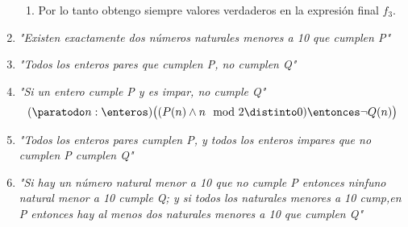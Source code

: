\begin{enumerate}[label=\tiny\faIcon{yin-yang}$_{\arabic*}$]
\begin{enumerate}[label=\tiny\faIcon{meh-rolling-eyes}]
          \item Por lo tanto obtengo siempre valores verdaderos en la expresión final $f_3$.
        \end{enumerate}

  \item \textit{"Existen exactamente dos números naturales menores a 10 que cumplen P"}

  \item \textit{"Todos los enteros pares que cumplen P, no cumplen Q"}

  \item \textit{"Si un entero cumple P y es impar, no cumple Q"}
        $$
          (\paratodo n: \enteros)\bigr( (P(n) \land n \mod 2 \distinto 0 ) \entonces \neg Q(n) \bigr)
        $$

  \item \textit{"Todos los enteros pares cumplen P, y todos los enteros impares que no cumplen P cumplen Q"}

  \item \textit{"Si hay un número natural menor a 10 que no cumple P entonces ninfuno natural menor a 10 cumple Q; y si todos los
          naturales menores a 10 cump,en P entonces hay al menos dos naturales menores a 10 que cumplen Q"}
\end{enumerate}
